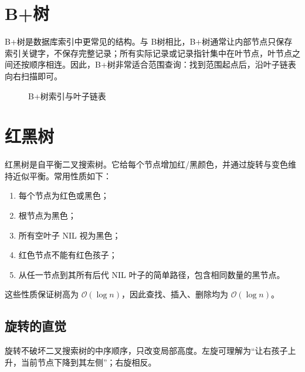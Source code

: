 \documentclass[UTF8,oneside,12pt]{ctexbook}
\newcommand{\bigO}{\mathcal O}
\begin{document}
\section{B+树}
B+树是数据库索引中更常见的结构。与 B树相比，B+树通常让内部节点只保存索引关键字，不保存完整记录；所有实际记录或记录指针集中在叶节点，叶节点之间还按顺序相连。因此，B+树非常适合范围查询：找到范围起点后，沿叶子链表向右扫描即可。

\begin{figure}[htbp]
\centering
{}
\caption{B+树索引与叶子链表}
\end{figure}

\section{红黑树}
红黑树是自平衡二叉搜索树。它给每个节点增加红/黑颜色，并通过旋转与变色维持近似平衡。常用性质如下：
\begin{enumerate}
  \item 每个节点为红色或黑色；
  \item 根节点为黑色；
  \item 所有空叶子 NIL 视为黑色；
  \item 红色节点不能有红色孩子；
  \item 从任一节点到其所有后代 NIL 叶子的简单路径，包含相同数量的黑节点。
\end{enumerate}
这些性质保证树高为 $\bigO(\log n)$，因此查找、插入、删除均为 $\bigO(\log n)$。

\subsection{旋转的直觉}
旋转不破坏二叉搜索树的中序顺序，只改变局部高度。左旋可理解为“让右孩子上升，当前节点下降到其左侧”；右旋相反。
\end{document}
